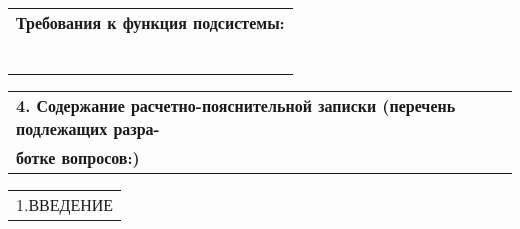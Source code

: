 \documentclass[12pt, А4, twoside]{article} %
\begin{document}
\begin{FlushLeft}
    \begin{tabular}{p{17.25cm}} 
        \textsf{\textbf{Требования к функция подсистемы:}} \vspace{1pt} \hline \\
        \vspace{1pt} \hline \\
        \vspace{1pt} \hline \\
        \vspace{1pt} \hline \\
        \vspace{1pt} \hline \\
        \vspace{1pt} \hline \\
        \vspace{1pt} \hline 
    \end{tabular}   

    \begin{tabular}{p{17.25cm}}
        \textsf{\textbf{4. Содержание расчетно-пояснительной записки (перечень подлежащих разра-}} \vspace{1pt} \hline \\
        \textsf{\textbf{ботке вопросов:)}} \vspace{1pt} \hline \\
    \end{tabular} 
    
    \begin{tabular}{p{17.25cm}} 
        \textsf{1.ВВЕДЕНИЕ} \vspace{1pt} \hline \\
    \end{tabular} 


\end{FlushLeft}
\end{document}
